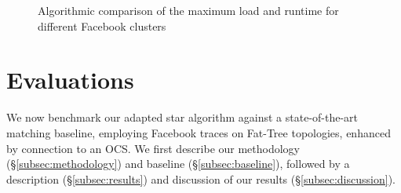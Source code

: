 \documentclass[sigconf]{acmart}
\begin{document}
\begin{figure}
\centering
{}%
\hfill%
%
\hfill%
%
\hfill%
%
\hfill%
\vspace{-0.2cm}
\caption{Algorithmic comparison of the maximum load and runtime for different Facebook clusters}
\label{fig:plots}
\end{figure}


\section{Evaluations}\label{sec:eval}
We now benchmark our adapted star algorithm against a state-of-the-art matching baseline, employing Facebook traces on Fat-Tree topologies, enhanced by connection to an OCS.
We first describe our methodology (\S\ref{subsec:methodology}) and baseline (\S\ref{subsec:baseline}), followed by a description (\S\ref{subsec:results}) and discussion of our results (\S\ref{subsec:discussion}).
\end{document}
